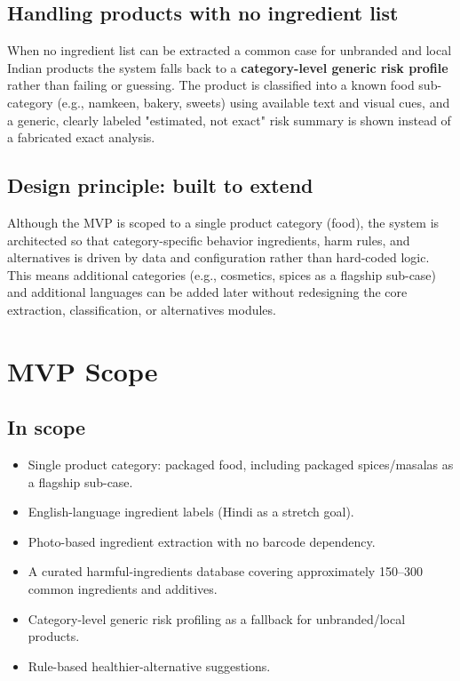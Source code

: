 \documentclass[11pt,a4paper]{article}
\begin{document}
\subsection{Handling products with no ingredient list}
When no ingredient list can be extracted a common case for unbranded and local Indian products the system falls back to a \textbf{category-level generic risk profile} rather than failing or guessing. The product is classified into a known food sub-category (e.g., namkeen, bakery, sweets) using available text and visual cues, and a generic, clearly labeled "estimated, not exact" risk summary is shown instead of a fabricated exact analysis.

\subsection{Design principle: built to extend}
Although the MVP is scoped to a single product category (food), the system is architected so that category-specific behavior ingredients, harm rules, and alternatives is driven by data and configuration rather than hard-coded logic. This means additional categories (e.g., cosmetics, spices as a flagship sub-case) and additional languages can be added later without redesigning the core extraction, classification, or alternatives modules.

\section{MVP Scope}

\subsection{In scope}
\begin{itemize}
  \item Single product category: packaged food, including packaged spices/masalas as a flagship sub-case.
  \item English-language ingredient labels (Hindi as a stretch goal).
  \item Photo-based ingredient extraction with no barcode dependency.
  \item A curated harmful-ingredients database covering approximately 150--300 common ingredients and additives.
  \item Category-level generic risk profiling as a fallback for unbranded/local products.
  \item Rule-based healthier-alternative suggestions.
\end{itemize}
\end{document}

